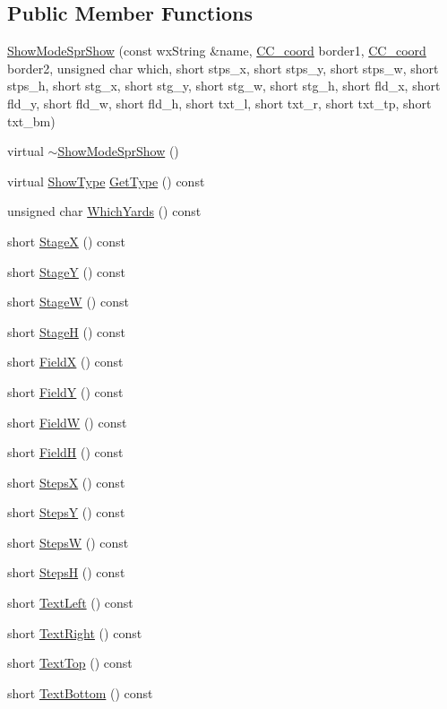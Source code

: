 \subsection*{Public Member Functions}
\begin{DoxyCompactItemize}
\item 
\hyperlink{a00142_ac633fa4f658e695b969a64b5f88a400f}{Show\-Mode\-Spr\-Show} (const wx\-String \&name, \hyperlink{a00029}{C\-C\-\_\-coord} border1, \hyperlink{a00029}{C\-C\-\_\-coord} border2, unsigned char which, short stps\-\_\-x, short stps\-\_\-y, short stps\-\_\-w, short stps\-\_\-h, short stg\-\_\-x, short stg\-\_\-y, short stg\-\_\-w, short stg\-\_\-h, short fld\-\_\-x, short fld\-\_\-y, short fld\-\_\-w, short fld\-\_\-h, short txt\-\_\-l, short txt\-\_\-r, short txt\-\_\-tp, short txt\-\_\-bm)
\item 
virtual \hyperlink{a00142_a170a3df092a0dde6250da0f4b9794d56}{$\sim$\-Show\-Mode\-Spr\-Show} ()
\item 
virtual \hyperlink{a00140_a03678eaf2ac733b19b863d9fef35077c}{Show\-Type} \hyperlink{a00142_ae9f5784ddbcfb7a71c2dca292f4e68f4}{Get\-Type} () const 
\item 
unsigned char \hyperlink{a00142_ac13e2134907aa54456ae9bf312d1ae61}{Which\-Yards} () const 
\item 
short \hyperlink{a00142_af74e78669b362a7482e069781ba111c2}{Stage\-X} () const 
\item 
short \hyperlink{a00142_a0bf01c78a0580c4cc250238b07f421f3}{Stage\-Y} () const 
\item 
short \hyperlink{a00142_ac2116d293c357052d9c79bab3340c1a8}{Stage\-W} () const 
\item 
short \hyperlink{a00142_ac292d4711ec8e6ea4e1a5b7b3d63f941}{Stage\-H} () const 
\item 
short \hyperlink{a00142_a1cbff406fde8e18092d5fe271f479671}{Field\-X} () const 
\item 
short \hyperlink{a00142_a72fe930e9f3796437bdd0ae34d96413c}{Field\-Y} () const 
\item 
short \hyperlink{a00142_a5a8792d7f300445ef008ff442415c2d9}{Field\-W} () const 
\item 
short \hyperlink{a00142_a960a6d1dc5667f00639bd3f4650c0ecc}{Field\-H} () const 
\item 
short \hyperlink{a00142_a33af74f6a31e4d7c725319dca83170a1}{Steps\-X} () const 
\item 
short \hyperlink{a00142_a7ba0209fcd46eaf4d5feae7b915cef02}{Steps\-Y} () const 
\item 
short \hyperlink{a00142_a03ba1f94a583e6588ca9e13cf80f614a}{Steps\-W} () const 
\item 
short \hyperlink{a00142_aac691e2241fdebe8aff435f4d2e09b6f}{Steps\-H} () const 
\item 
short \hyperlink{a00142_aaa4ca560f15d0ba43e9f229220c2b836}{Text\-Left} () const 
\item 
short \hyperlink{a00142_ab308a7eca6658d31588a94b6b3f69f8a}{Text\-Right} () const 
\item 
short \hyperlink{a00142_a2ee33118114259bbbb782a34da48c779}{Text\-Top} () const 
\item 
short \hyperlink{a00142_af4e85874af0c271b151a7bfc43039fd0}{Text\-Bottom} () const 
\end{DoxyCompactItemize}

